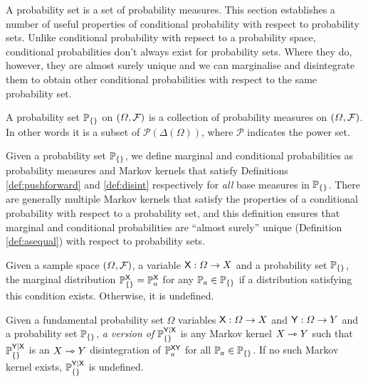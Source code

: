 A probability set is a set of probability measures. This section establishes a number of useful properties of conditional probability with respect to probability sets. Unlike conditional probability with repsect to a probability space, conditional probabilities don't always exist for probability sets. Where they do, however, they are almost surely unique and we can marginalise and disintegrate them to obtain other conditional probabilities with respect to the same probability set.

\begin{definition}
A probability set $\mathbb{P}_{\{\}}$ on $(\Omega,\mathcal{F})$ is a collection of probability measures on $(\Omega,\mathcal{F})$. In other words it is a subset of $\mathscr{P}(\Delta(\Omega))$, where $\mathscr{P}$ indicates the power set.
\end{definition}

Given a probability set $\mathbb{P}_{\{\}}$, we define marginal and conditional probabilities as probability measures and Markov kernels that satisfy Definitions \ref{def:pushforward} and \ref{def:disint} respectively for \emph{all} base measures in $\mathbb{P}_{\{\}}$. There are generally multiple Markov kernels that satisfy the properties of a conditional probability with respect to a probability set, and this definition ensures that marginal and conditional probabilities are ``almost surely'' unique (Definition \ref{def:asequal}) with respect to probability sets.

\begin{definition}
Given a sample space $(\Omega,\mathcal{F})$, a variable $\mathsf{X}:\Omega\to X$ and a probability set $\mathbb{P}_{\{\}}$, the marginal distribution $\mathbb{P}_{\{\}}^{\mathsf{X}}=\mathbb{P}_a^{\mathsf{X}}$ for any $\mathbb{P}_a\in\mathbb{P}_{\{\}}$ if a distribution satisfying this condition exists. Otherwise, it is undefined.
\end{definition}

\begin{definition}
Given a fundamental probability set $\Omega$ variables $\mathsf{X}:\Omega\to X$ and $\mathsf{Y}:\Omega\to Y$ and a probability set $\mathbb{P}_{\{\}}$, \emph{a version of} $\mathbb{P}_{\{\}}^{\mathsf{Y}|\mathsf{X}}$ is any Markov kernel $X\rightarrowtriangle Y$ such that $\mathbb{P}_{\{\}}^{\mathsf{Y}|\mathsf{X}}$ is an $X\rightarrowtriangle Y$ disintegration of $\mathbb{P}_a^{\mathsf{XY}}$ for all $\mathbb{P}_a\in \mathbb{P}_{\{\}}$. If no such Markov kernel exists, $\mathbb{P}_{\{\}}^{\mathsf{Y}|\mathsf{X}}$ is undefined.
\end{definition}

